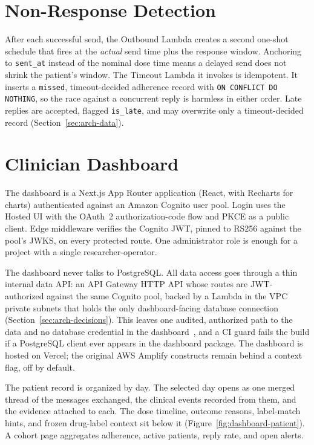 \section{Non-Response Detection}
\label{sec:arch-timeout}

After each successful send, the Outbound Lambda creates a second one-shot
schedule that fires at the \emph{actual} send time plus the response window.
Anchoring to \texttt{sent\_at} instead of the nominal dose time means a delayed
send does not shrink the patient's window. The Timeout Lambda it invokes is
idempotent. It inserts a \texttt{missed}, timeout-decided adherence record with
\texttt{ON CONFLICT DO NOTHING}, so the race against a concurrent reply is
harmless in either order. Late replies are accepted, flagged
\texttt{is\_late}, and may overwrite only a timeout-decided record
(Section~\ref{sec:arch-data}).

\section{Clinician Dashboard}
\label{sec:arch-dashboard}

The dashboard is a Next.js App Router application (React, with Recharts for
charts) authenticated against an Amazon Cognito user pool. Login uses the
Hosted UI with the OAuth~2 authorization-code flow and PKCE as a public client.
Edge middleware verifies the Cognito JWT, pinned to RS256 against the pool's
JWKS, on every protected route. One administrator role is enough for a project
with a single researcher-operator.

The dashboard never talks to PostgreSQL. All data access goes through a thin
internal data API: an API Gateway HTTP API whose routes are JWT-authorized
against the same Cognito pool, backed by a Lambda in the VPC private subnets
that holds the only dashboard-facing database connection
(Section~\ref{sec:arch-decisions}). This leaves one audited, authorized path to
the data and no database credential in the
dashboard~\cite{saltzer1975protection}, and a CI guard fails the build if a
PostgreSQL client ever appears in the dashboard package. The dashboard is
hosted on Vercel; the original AWS Amplify constructs remain behind a context
flag, off by default.

The patient record is organized by day. The selected day opens as one merged
thread of the messages exchanged, the clinical events recorded from them, and
the evidence attached to each. The dose timeline, outcome reasons, label-match
hints, and frozen drug-label context sit below it
(Figure~\ref{fig:dashboard-patient}). A cohort page aggregates adherence,
active patients, reply rate, and open alerts.


